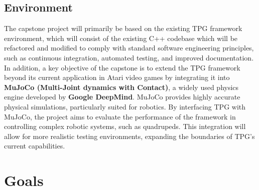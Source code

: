 \documentclass{article}
\begin{document}
\subsection{Environment}

The capstone project will primarily be based on the existing TPG framework environment, which will consist of the existing C++ codebase which will be refactored and modified to comply with standard software engineering principles, such as continuous integration, automated testing, and improved documentation. In addition, a key objective of the capstone is to extend the TPG framework beyond its current application in Atari video games by integrating it into \textbf{MuJoCo (Multi-Joint dynamics with Contact)}, a widely used physics engine developed by\textbf{ Google DeepMind}. MuJoCo provides highly accurate physical simulations, particularly suited for robotics. By interfacing TPG with MuJoCo, the project aims to evaluate the performance of the framework in controlling complex robotic systems, such as quadrupeds. This integration will allow for more realistic testing environments, expanding the boundaries of TPG's current capabilities. 

\section{Goals}
\end{document}
